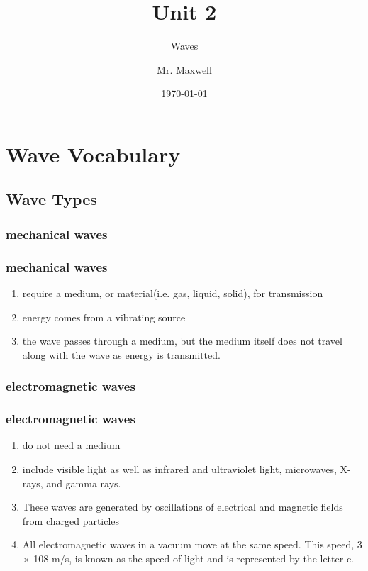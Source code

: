 \documentclass{beamer}
\title{Unit 2}
\subtitle{Waves}
\author{Mr. Maxwell}
\institute{PACS}
\date{\today}
\begin{document}
\frame{\titlepage}
\frame{\tableofcontents}

\section{Wave Vocabulary}

\subsection{Wave Types}

\subsubsection{mechanical waves}

\begin{frame}
    \frametitle{mechanical waves}
    
    \begin{enumerate}
        \item require a medium, or material(i.e. gas, liquid, solid), for transmission
        \item energy comes from a vibrating source
        \item the wave passes through a medium, but the medium itself does not travel along with the wave as energy is transmitted.
    \end{enumerate}
\end{frame}

\subsubsection{electromagnetic waves}

\begin{frame}
    \frametitle{electromagnetic waves}
    
    \begin{enumerate}
        \item do not need a medium
        \item include visible light as well as infrared and ultraviolet light, microwaves, X-rays, and gamma rays.
        \item  These waves are generated by oscillations of electrical and magnetic fields from charged particles
        \item  All electromagnetic waves in a vacuum move at the same speed. This speed, 3 × 108 m/s, is known as the speed of light and is represented by the letter c.
    \end{enumerate}
\end{frame}
\end{document}
